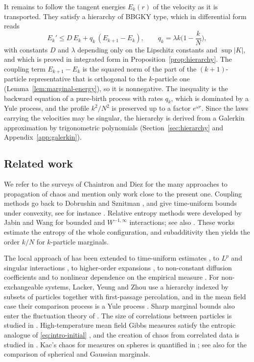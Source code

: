\documentclass[11pt]{amsart}
\numberwithin{equation}{section}
\theoremstyle{plain}
\theoremstyle{remark}
\begin{document}
It remains to follow the tangent energies $E_k(r)$ of the velocity as it is transported. They satisfy a hierarchy of BBGKY type, which in differential form reads
\[
E_k'\le D\,E_k+q_k\,(E_{k+1}-E_k),\qquad q_k=\lambda k\Big(1-\frac kN\Big),
\]
with constants $D$ and $\lambda$ depending only on the Lipschitz constants and $\sup|K|$, and which is proved in integrated form in Proposition~\ref{prop:hierarchy}. The coupling term $E_{k+1}-E_k$ is the squared norm of the part of the $(k+1)$-particle representative that is orthogonal to the $k$-particle one (Lemma~\ref{lem:marginal-energy}), so it is nonnegative. The inequality is the backward equation of a pure-birth process with rates $q_k$, which is dominated by a Yule process, and the profile $k^2/N^2$ is preserved up to a factor $e^{\omega r}$. Since the laws carrying the velocities may be singular, the hierarchy is derived from a Galerkin approximation by trigonometric polynomials (Section~\ref{sec:hierarchy} and Appendix~\ref{app:galerkin}).

\subsection{Related work}
We refer to the surveys of Chaintron and Diez \cite{CD22a,CD22b} for the many approaches to propagation of chaos and mention only work close to the present one. Coupling methods go back to Dobrushin \cite{Dob79} and Sznitman \cite{Szn91}, and give time-uniform bounds under convexity, see for instance \cite{Mal03}. Relative entropy methods were developed by Jabin and Wang \cite{JW16,JW18} for bounded and $W^{-1,\infty}$ interactions; see also \cite{Lac18,Jab19,FW26}. These works estimate the entropy of the whole configuration, and subadditivity then yields the order $k/N$ for $k$-particle marginals.

The local approach of \cite{Lac23} has been extended to time-uniform estimates \cite{LL23,MRW24}, to $L^p$ and singular interactions \cite{Han22,Wan26}, to higher-order expansions \cite{HR25}, to non-constant diffusion coefficients \cite{GGP25} and to nonlinear dependence on the empirical measure \cite{AL26}. For non-exchangeable systems, Lacker, Yeung and Zhou \cite{LYZ24} use a hierarchy indexed by subsets of particles together with first-passage percolation, and in the mean field case their comparison process is a Yule process \cite[Section~1.5]{LYZ24}. Sharp marginal bounds also enter the fluctuation theory of \cite{SY26}. The size of correlations between particles is studied in \cite{PPS19,Due21}. High-temperature mean field Gibbs measures satisfy the entropic analogue of \eqref{eq:intro-initial} \cite{Lac22}, and the creation of chaos from correlated data is studied in \cite{RS25,BDM26}. Kac's chaos for measures on spheres is quantified in \cite{HM14,Car15}; see also \cite{DF87} for the comparison of spherical and Gaussian marginals.
\end{document}
